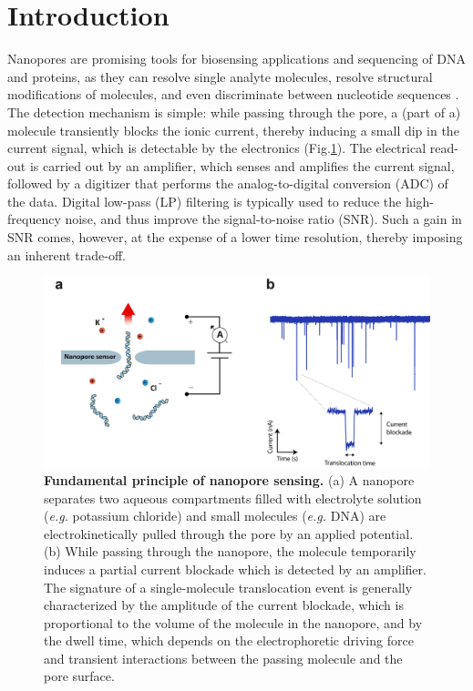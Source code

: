 \newpage


\section{Introduction}
Nanopores are promising tools for biosensing applications and sequencing of DNA and proteins, as they can resolve single analyte molecules, resolve structural modifications of molecules, and even discriminate between nucleotide sequences \cite{Dekker2007,Carson2015,Maglia2010,Feng2015a,Lin2018,Atas2012,Yang2018,Squires2013,Miles2012,Wu2014}. The detection mechanism is simple: while passing through the pore, a (part of a) molecule transiently blocks the ionic current, thereby inducing a small dip in the current signal, which is detectable by the electronics (Fig.\ref{fig:fig3.1}). The electrical read-out is carried out by an amplifier, which senses and amplifies the current signal, followed by a digitizer that performs the analog-to-digital conversion (ADC) of the data. Digital low-pass (LP) filtering is typically used to reduce the high-frequency noise, and thus improve the signal-to-noise ratio (SNR). Such a gain in SNR comes, however, at the expense of a lower time resolution, thereby imposing an inherent trade-off.


\begin{figure}[h]
	\includegraphics[width=\linewidth]{figures/Figure3.1.png}
     \caption{\textbf{Fundamental principle of nanopore sensing.} (a) A nanopore separates two aqueous compartments filled with electrolyte solution (\emph{e.g.} potassium chloride) and small molecules (\emph{e.g.} DNA) are electrokinetically pulled through the pore by an applied potential. (b) While passing through the nanopore, the molecule temporarily induces a partial current blockade which is detected by an amplifier. The signature of a single-molecule translocation event is generally characterized by the amplitude of the current blockade, which is proportional to the volume of the molecule in the nanopore, and by the dwell time, which depends on the electrophoretic driving force and transient interactions between the passing molecule and the pore surface.}
	\label{fig:fig3.1}
\end{figure}


